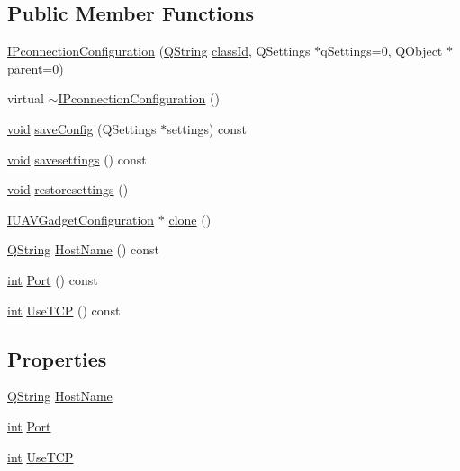 \subsection*{Public Member Functions}
\begin{DoxyCompactItemize}
\item 
\hyperlink{group___i_p_conn_plugin_ga0ace87181ef54adf63c246bcfa013840}{I\-Pconnection\-Configuration} (\hyperlink{group___u_a_v_objects_plugin_gab9d252f49c333c94a72f97ce3105a32d}{Q\-String} \hyperlink{group___core_plugin_gac953657221ba7fda967ada0408332641}{class\-Id}, Q\-Settings $\ast$q\-Settings=0, Q\-Object $\ast$parent=0)
\item 
virtual \hyperlink{group___i_p_conn_plugin_ga9c8548dfb0fd37208686bb5d037dfce4}{$\sim$\-I\-Pconnection\-Configuration} ()
\item 
\hyperlink{group___u_a_v_objects_plugin_ga444cf2ff3f0ecbe028adce838d373f5c}{void} \hyperlink{group___i_p_conn_plugin_ga65bf62eee71070aef5ce1f9fe1f24322}{save\-Config} (Q\-Settings $\ast$settings) const 
\item 
\hyperlink{group___u_a_v_objects_plugin_ga444cf2ff3f0ecbe028adce838d373f5c}{void} \hyperlink{group___i_p_conn_plugin_ga6e5d554b42d69fd06e4817ec4bece987}{savesettings} () const 
\item 
\hyperlink{group___u_a_v_objects_plugin_ga444cf2ff3f0ecbe028adce838d373f5c}{void} \hyperlink{group___i_p_conn_plugin_gabd3e5ffc6975c4ef5389faaf21fb55c0}{restoresettings} ()
\item 
\hyperlink{group___core_plugin_gacdfdf0b1e39b5002472b76b6564ce51f}{I\-U\-A\-V\-Gadget\-Configuration} $\ast$ \hyperlink{group___i_p_conn_plugin_gaf970300a500acc18095f6d50a3926529}{clone} ()
\item 
\hyperlink{group___u_a_v_objects_plugin_gab9d252f49c333c94a72f97ce3105a32d}{Q\-String} \hyperlink{group___i_p_conn_plugin_gad855d70f2d3eee8910ee94c261e9f3cb}{Host\-Name} () const 
\item 
\hyperlink{ioapi_8h_a787fa3cf048117ba7123753c1e74fcd6}{int} \hyperlink{group___i_p_conn_plugin_gaaa57ca41a00de517e859afa3c339099a}{Port} () const 
\item 
\hyperlink{ioapi_8h_a787fa3cf048117ba7123753c1e74fcd6}{int} \hyperlink{group___i_p_conn_plugin_ga584108a558af4b69e0494772eb273f94}{Use\-T\-C\-P} () const 
\end{DoxyCompactItemize}
\subsection*{Properties}
\begin{DoxyCompactItemize}
\item 
\hyperlink{group___u_a_v_objects_plugin_gab9d252f49c333c94a72f97ce3105a32d}{Q\-String} \hyperlink{group___i_p_conn_plugin_gaa540a20af79b7ec845405fb81a75dd82}{Host\-Name}
\item 
\hyperlink{ioapi_8h_a787fa3cf048117ba7123753c1e74fcd6}{int} \hyperlink{group___i_p_conn_plugin_ga016b44f60ba95951cdf428d88a119a97}{Port}
\item 
\hyperlink{ioapi_8h_a787fa3cf048117ba7123753c1e74fcd6}{int} \hyperlink{group___i_p_conn_plugin_ga40b7a131ca4ee4e1c315a0fc12281da8}{Use\-T\-C\-P}
\end{DoxyCompactItemize}


